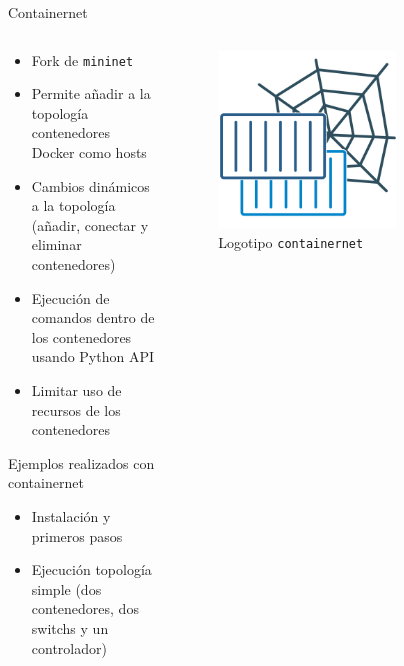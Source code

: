 \documentclass[aspectratio=169,xcolor=dvipsnames]{beamer}
\begin{document}
	\begin{frame}{Containernet}
	
	    \begin{columns}
	        \begin{column}{0.6\textwidth}
	        \begin{itemize}
	            \item Fork de \texttt{mininet}
	            \item Permite añadir a la topología contenedores Docker como hosts
	            \item Cambios dinámicos a la topología (añadir, conectar y eliminar contenedores)
	            \item Ejecución de comandos dentro de los contenedores usando Python API
	            \item Limitar uso de recursos de los contenedores
	        \end{itemize}
	        
	        \begin{alertblock}{Ejemplos realizados con containernet}
	        \begin{itemize}
	            \item Instalación y primeros pasos
	            \item Ejecución topología simple (dos contenedores, dos switchs y un controlador)
	        \end{itemize}
	        \end{alertblock}
	        \end{column}
	        
	        \begin{column}{0.4\textwidth}
	        \begin{figure}[h]
            \includegraphics[width=0.7\textwidth]{img/containernet_logo.png}
            \caption{Logotipo \texttt{containernet}}
            \end{figure}
	        \end{column}
	    \end{columns}
	\end{frame}
\end{document}

